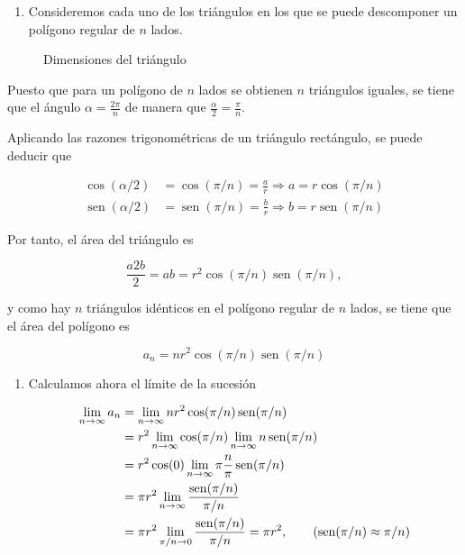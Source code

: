 \documentclass[
  spanish,
  a4paper,
]{scrreport}
\providecommand{\tightlist}{%
  \setlength{\itemsep}{0pt}\setlength{\parskip}{0pt}}
\theoremstyle{definition}
\theoremstyle{remark}
\begin{document}
\begin{tcolorbox}[enhanced jigsaw, arc=.35mm, bottomrule=.15mm, bottomtitle=1mm, breakable, colback=white, colbacktitle=quarto-callout-tip-color!10!white, colframe=quarto-callout-tip-color-frame, coltitle=black, left=2mm, leftrule=.75mm, opacityback=0, opacitybacktitle=0.6, rightrule=.15mm, title=\textcolor{quarto-callout-tip-color}{\faLightbulb}\hspace{0.5em}{Solución}, titlerule=0mm, toprule=.15mm, toptitle=1mm]

\begin{enumerate}
\def\labelenumi{\alph{enumi}.}
\tightlist
\item
  Consideremos cada uno de los triángulos en los que se puede
  descomponer un polígono regular de \(n\) lados.
\end{enumerate}

\begin{figure}[H]
\centering

\caption{Dimensiones del triángulo}
\end{figure}

Puesto que para un polígono de \(n\) lados se obtienen \(n\) triángulos
iguales, se tiene que el ángulo \(\alpha=\frac{2\pi}{n}\) de manera que
\(\frac{\alpha}{2} = \frac{\pi}{n}\).

Aplicando las razones trigonométricas de un triángulo rectángulo, se
puede deducir que

\begin{align*}
\cos(\alpha/2) &= \cos(\pi/n) = \frac{a}{r} \Rightarrow a = r\cos(\pi/n)\\
\operatorname{sen}(\alpha/2) &= \operatorname{sen}(\pi/n) = \frac{b}{r} \Rightarrow b = r\operatorname{sen}(\pi/n)
\end{align*}

Por tanto, el área del triángulo es

\[
\frac{a2b}{2} = ab= r^2\cos(\pi/n)\operatorname{sen}(\pi/n),
\]

y como hay \(n\) triángulos idénticos en el polígono regular de \(n\)
lados, se tiene que el área del polígono es

\[
a_n  = n r^2\cos(\pi/n)\operatorname{sen}(\pi/n)
\]

\begin{enumerate}
\def\labelenumi{\alph{enumi}.}
\setcounter{enumi}{1}
\item
  Calculamos ahora el límite de la sucesión

  \begin{align*}
   \lim_{n\to\infty} a_n &= \lim_{n\to\infty} n r^2\cos(\pi/n)\operatorname{sen}(\pi/n)\\ 
   &= r^2 \lim_{n\to\infty}\cos(\pi/n)\lim_{n\to\infty}n\operatorname{sen}(\pi/n) \\ 
   &= r^2 \cos(0)\lim_{n\to\infty}\pi\frac{n}{\pi}\operatorname{sen}(\pi/n) \\ 
   &= \pi r^2 \lim_{n\to\infty}\frac{\operatorname{sen}(\pi/n)}{\pi/n} \\
   &= \pi r^2 \lim_{\pi/n\to 0} \frac{\operatorname{sen}(\pi/n)}{\pi/n} = \pi r^2, \tag{$\operatorname{sen}(\pi/n)\approx \pi/n$}
   \end{align*}


\end{enumerate}
\end{tcolorbox}
\end{document}
